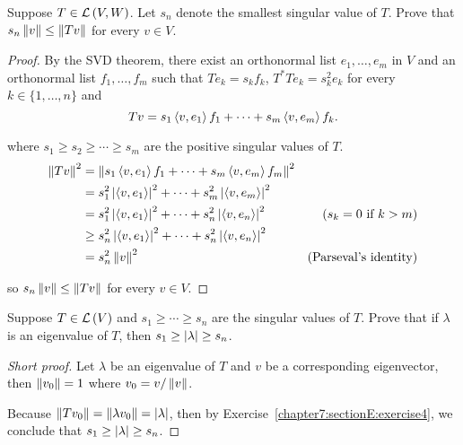 \begin{exercise}\label{chapter7:sectionE:exercise14}
    Suppose $T\in\mathcal{L}\left({V, W}\right)$. Let $s_{n}$ denote the smallest singular value of $T$. Prove that $s_{n}\left\Vert{v}\right\Vert\leq \left\Vert{Tv}\right\Vert$ for every $v\in V$.
\end{exercise}

\begin{proof}
    By the SVD theorem, there exist an orthonormal list $e_{1}, \ldots, e_{m}$ in $V$ and an orthonormal list $f_{1}, \ldots, f_{m}$ such that $Te_{k} = s_{k}f_{k}$, $T^{*}Te_{k} = s_{k}^{2}e_{k}$ for every $k\in\{1,\ldots,n\}$ and
    \[
        Tv = s_{1}\left\langle{v,e_{1}}\right\rangle f_{1} + \cdots + s_{m}\left\langle{v,e_{m}}\right\rangle f_{k}.
    \]

    where $s_{1}\geq s_{2}\geq \cdots \geq s_{m}$ are the positive singular values of $T$.
    \begin{align*}
        \left\Vert{Tv}\right\Vert^{2} & = \left\Vert{s_{1}\left\langle{v,e_{1}}\right\rangle f_{1} + \cdots + s_{m}\left\langle{v,e_{m}}\right\rangle f_{m}}\right\Vert^{2}                                              \\
                      & = s_{1}^{2}\left\vert{\left\langle{v, e_{1}}\right\rangle}\right\vert^{2} + \cdots + s_{m}^{2}\left\vert{\left\langle{v, e_{m}}\right\rangle}\right\vert^{2}                                     \\
                      & = s_{1}^{2}\left\vert{\left\langle{v, e_{1}}\right\rangle}\right\vert^{2} + \cdots + s_{n}^{2}\left\vert{\left\langle{v, e_{n}}\right\rangle}\right\vert^{2}   & \text{($s_{k} = 0$ if $k > m$)} \\
                      & \geq s_{n}^{2}\left\vert{\left\langle{v, e_{1}}\right\rangle}\right\vert^{2} + \cdots + s_{n}^{2}\left\vert{\left\langle{v,e_{n}}\right\rangle}\right\vert^{2}                                   \\
                      & = s_{n}^{2}\left\Vert{v}\right\Vert^{2}                                                                        & \text{(Parseval's identity)}
    \end{align*}

    so $s_{n}\left\Vert{v}\right\Vert\leq \left\Vert{Tv}\right\Vert$ for every $v\in V$.
\end{proof}
\newpage

\begin{exercise}
    Suppose $T\in\mathcal{L}\left({V}\right)$ and $s_{1}\geq \cdots\geq s_{n}$ are the singular values of $T$. Prove that if $\lambda$ is an eigenvalue of $T$, then $s_{1}\geq \left\vert{\lambda}\right\vert\geq s_{n}$.
\end{exercise}

\begin{proof}[Short proof]
    Let $\lambda$ be an eigenvalue of $T$ and $v$ be a corresponding eigenvector, then $\left\Vert{v_{0}}\right\Vert = 1$ where $v_{0} = v/\left\Vert{v}\right\Vert$.

    Because $\left\Vert{Tv_{0}}\right\Vert = \left\Vert{\lambda v_{0}}\right\Vert = \left\vert{\lambda}\right\vert$, then by Exercise~\ref{chapter7:sectionE:exercise4}, we conclude that $s_{1}\geq \left\vert{\lambda}\right\vert\geq s_{n}$.
\end{proof}


